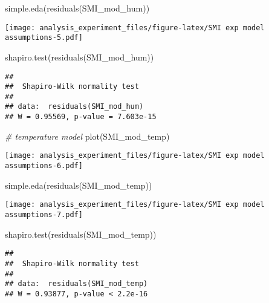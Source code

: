 \documentclass[
]{article}
\newenvironment{Shaded}{\begin{snugshade}}{\end{snugshade}}
\newcommand{\CommentTok}[1]{\textcolor[rgb]{0.56,0.35,0.01}{\textit{#1}}}
\newcommand{\FunctionTok}[1]{\textcolor[rgb]{0.00,0.00,0.00}{#1}}
\newcommand{\NormalTok}[1]{#1}
\begin{document}
\begin{Shaded}
\begin{Highlighting}[]
\FunctionTok{simple.eda}\NormalTok{(}\FunctionTok{residuals}\NormalTok{(SMI\_mod\_hum))}
\end{Highlighting}
\end{Shaded}

\texttt{[image: analysis\_experiment\_files/figure-latex/SMI exp model assumptions-5.pdf]}

\begin{Shaded}
\begin{Highlighting}[]
\FunctionTok{shapiro.test}\NormalTok{(}\FunctionTok{residuals}\NormalTok{(SMI\_mod\_hum))}
\end{Highlighting}
\end{Shaded}

\begin{verbatim}
## 
##  Shapiro-Wilk normality test
## 
## data:  residuals(SMI_mod_hum)
## W = 0.95569, p-value = 7.603e-15
\end{verbatim}

\begin{Shaded}
\begin{Highlighting}[]
\CommentTok{\# temperature model}
\FunctionTok{plot}\NormalTok{(SMI\_mod\_temp)}
\end{Highlighting}
\end{Shaded}

\texttt{[image: analysis\_experiment\_files/figure-latex/SMI exp model assumptions-6.pdf]}

\begin{Shaded}
\begin{Highlighting}[]
\FunctionTok{simple.eda}\NormalTok{(}\FunctionTok{residuals}\NormalTok{(SMI\_mod\_temp))}
\end{Highlighting}
\end{Shaded}

\texttt{[image: analysis\_experiment\_files/figure-latex/SMI exp model assumptions-7.pdf]}

\begin{Shaded}
\begin{Highlighting}[]
\FunctionTok{shapiro.test}\NormalTok{(}\FunctionTok{residuals}\NormalTok{(SMI\_mod\_temp))}
\end{Highlighting}
\end{Shaded}

\begin{verbatim}
## 
##  Shapiro-Wilk normality test
## 
## data:  residuals(SMI_mod_temp)
## W = 0.93877, p-value < 2.2e-16
\end{verbatim}
\end{document}
